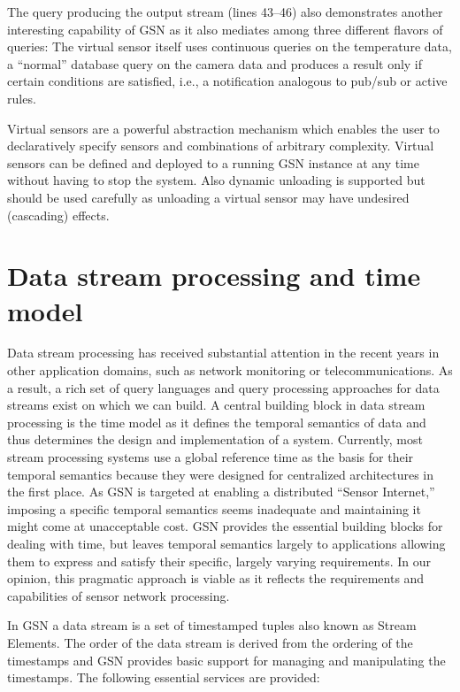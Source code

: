 The query producing the output stream (lines 43--46) also demonstrates another
interesting capability of GSN as it also mediates among three different flavors
of queries: The virtual sensor itself uses continuous queries on the
temperature data, a ``normal'' database query on the camera data and
produces a result only if certain conditions are satisfied, i.e., a
notification analogous to pub/sub or active rules.

Virtual sensors are a powerful abstraction mechanism which enables the user to
declaratively specify sensors and combinations of arbitrary complexity. Virtual
sensors can be defined and deployed to a running GSN instance at any time
without having to stop the system. Also dynamic unloading is supported but
should be used carefully as unloading a virtual sensor may have undesired
(cascading) effects. 

\section{Data stream processing and time model}
\label{sec:data-stre-proc}

Data stream processing has received substantial attention in the
recent years in other application domains, such as network monitoring
or telecommunications. As a result, a rich set of query languages and
query processing approaches for data streams exist on which we can
build. A central building block in data stream processing is the time
model as it defines the temporal semantics of data and thus determines
the design and implementation of a system. Currently, most stream
processing systems use a global reference time as the basis for their
temporal semantics because they were designed for centralized
architectures in the first place. As GSN is targeted at enabling a
distributed ``Sensor Internet,'' imposing a specific temporal semantics
seems inadequate and maintaining it might come at unacceptable cost.
GSN provides the essential building blocks for dealing with time, but
leaves temporal semantics largely to applications allowing them to
express and satisfy their specific, largely varying requirements. In
our opinion, this pragmatic approach is viable as it reflects the
requirements and capabilities of sensor network processing.

In GSN a data stream is a set of timestamped tuples also known as Stream Elements.
The order of the data stream is derived from the ordering of the timestamps and GSN
provides basic support for managing and manipulating the timestamps.
The following essential services are provided:


